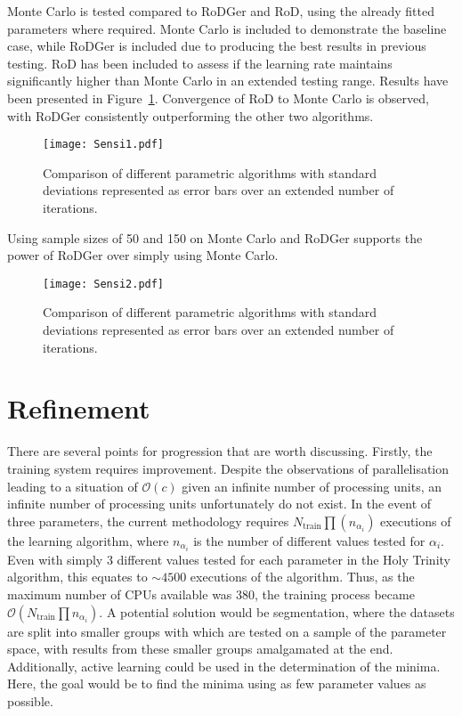 Monte Carlo is tested compared to RoDGer and RoD, using the already fitted parameters where required. Monte Carlo is included to demonstrate the baseline case, while RoDGer is included due to producing the best results in previous testing. RoD has been included to assess if the learning rate maintains significantly higher than Monte Carlo in an extended testing range. Results have been presented in Figure~\ref{fig:sensi1}. Convergence of RoD to Monte Carlo is observed, with RoDGer consistently outperforming the other two algorithms.

\begin{figure}[H]
    \begin{center}
        \texttt{[image: Sensi1.pdf]}
        \caption[Results of prolonged sampling]{Comparison of different parametric algorithms with standard deviations represented as error bars over an extended number of iterations.}
        \label{fig:sensi1}
    \end{center}
\end{figure}

Using sample sizes of 50 and 150 on Monte Carlo and RoDGer supports the power of RoDGer over simply using Monte  Carlo.

\begin{figure}[H]
    \begin{center}
        \texttt{[image: Sensi2.pdf]}
        \caption[Results of prolonged sampling]{Comparison of different parametric algorithms with standard deviations represented as error bars over an extended number of iterations.}
        \label{fig:sensi2}
    \end{center}
\end{figure}


\section{Refinement}
There are several points for progression that are worth discussing. Firstly, the training system requires improvement. Despite the observations of parallelisation leading to a situation of $\mathcal{O}(c)$ given an infinite number of processing units, an infinite number of processing units unfortunately do not exist. In the event of three parameters, the current methodology requires $N_\mathrm{train}\prod(n_{\alpha_i})$ executions of the learning algorithm, where $n_{\alpha_i}$ is the number of different values tested for $\alpha_i$. Even with simply 3 different values tested for each parameter in the Holy Trinity algorithm, this equates to $\sim{}4500$ executions of the algorithm. Thus, as the maximum number of CPUs available was 380, the training process became $\mathcal{O}\left(N_\mathrm{train}\prod{n_{\alpha_i}}\right)$. A potential solution would be segmentation, where the datasets are split into smaller groups with which are tested on a sample of the parameter space, with results from these smaller groups amalgamated at the end. Additionally, active learning could be used in the determination of the minima. Here, the goal would be to find the minima using as few parameter values as possible.

